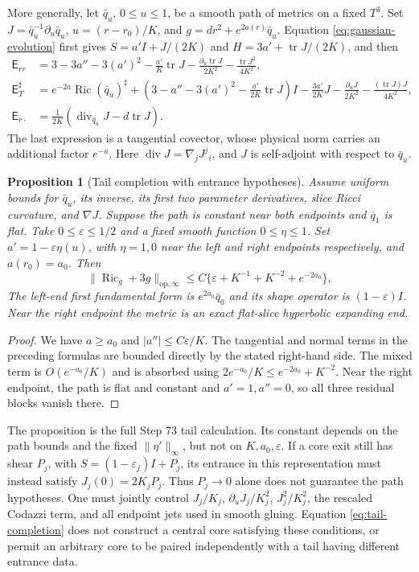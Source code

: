 \documentclass[a4paper,11pt]{article}
\numberwithin{equation}{section}
\newtheorem{proposition}[theorem]{Proposition}
\theoremstyle{definition}
\newcommand{\Ric}{\operatorname{Ric}}
\newcommand{\tr}{\operatorname{tr}}
\newcommand{\op}{\mathrm{op}}
\begin{document}
More generally, let $\bar q_u$, $0\le u\le1$, be a smooth path of metrics on a fixed $T^3$.
Set $J=\bar q_u^{-1}\partial_u\bar q_u$, $u=(r-r_0)/K$, and $g=dr^2+e^{2a(r)}\bar q_u$.
Equation \eqref{eq:gaussian-evolution} first gives
$S=a'I+J/(2K)$ and $H=3a'+\tr J/(2K)$, and then
\begin{align}
 \mathsf E_{rr}
 &=3-3a''-3(a')^2-\frac{a'}K\tr J
       -\frac{\partial_u\tr J}{2K^2}-\frac{\tr J^2}{4K^2},
       \label{eq:general-tail-normal}\\
 \mathsf E_T^\sharp
 &=e^{-2a}\Ric(\bar q_u)^\sharp
   +\left(3-a''-3(a')^2-\frac{a'}{2K}\tr J\right)I
   -\frac{3a'}{2K}J-\frac{\partial_uJ}{2K^2}
   -\frac{(\tr J)J}{4K^2},\label{eq:general-tail-tangent}\\
 \mathsf E_{r\cdot}
 &=\frac1{2K}\left(\operatorname{div}_{\bar q_u}J-d\tr J\right).
 \label{eq:general-tail-codazzi}
\end{align}
The last expression is a tangential covector, whose physical norm carries an additional factor $e^{-a}$.
Here $\operatorname{div}J=\nabla_jJ^j{}_i$, and $J$ is self-adjoint with respect to $\bar q_u$.

\begin{proposition}[Tail completion with entrance hypotheses]\label{prop:tail-completion}
Assume uniform bounds for $\bar q_u$, its inverse, its first two parameter derivatives, slice Ricci curvature, and $\nabla J$. Suppose the path is constant near both endpoints and $\bar q_1$ is flat.
Take $0\le\varepsilon\le1/2$ and a fixed smooth function $0\le\eta\le1$.
Set $a'=1-\varepsilon\eta(u)$, with $\eta=1,0$ near the left and right endpoints respectively, and $a(r_0)=a_0$. Then
\begin{equation}\label{eq:tail-completion}
 \|\Ric_g+3g\|_{\op,\infty}
 \le C\{\varepsilon+K^{-1}+K^{-2}+e^{-2a_0}\},
\end{equation}
The left-end first fundamental form is $e^{2a_0}\bar q_0$ and its shape operator is $(1-\varepsilon)I$.
Near the right endpoint the metric is an exact flat-slice hyperbolic expanding end.
\end{proposition}
\begin{proof}
We have $a\ge a_0$ and $|a''|\le C\varepsilon/K$.
The tangential and normal terms in the preceding formulas are bounded directly by the stated right-hand side. The mixed term is $O(e^{-a_0}/K)$ and is absorbed using $2e^{-a_0}/K\le e^{-2a_0}+K^{-2}$.
Near the right endpoint, the path is flat and constant and $a'=1,a''=0$, so all three residual blocks vanish there.
\end{proof}
The proposition is the full Step 73 tail calculation. Its constant depends on the path bounds and the fixed $\|\eta'\|_\infty$, but not on $K,a_0,\varepsilon$.
If a core exit still has shear $P_j$, with $S=(1-\varepsilon_j)I+P_j$, its entrance in this representation must instead satisfy $J_j(0)=2K_jP_j$.
Thus $P_j\to0$ alone does not guarantee the path hypotheses. One must jointly control $J_j/K_j$, $\partial_uJ_j/K_j^2$, $J_j^2/K_j^2$, the rescaled Codazzi term, and all endpoint jets used in smooth gluing.
Equation \eqref{eq:tail-completion} does not construct a central core satisfying these conditions, or permit an arbitrary core to be paired independently with a tail having different entrance data.
\end{document}
